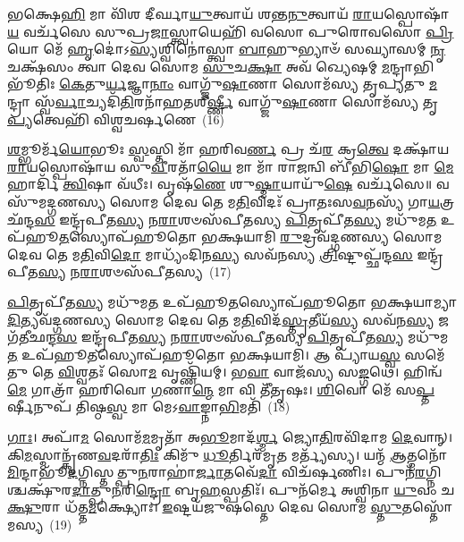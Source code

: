 {\anuvakamend[{\-\ul{𑌮}\-𑌖𑍋 𑌵𑌾 \ul{𑌅}\-𑌨𑍍𑌤𑌰𑌿᳴𑌕𑍍𑌷𑌾\-\ul{𑌤𑍍𑌪𑍍𑌰}\-𑌸𑌰𑍍𑌪᳴\-\ul{𑌨𑍍𑌤}\-𑌨𑍍𑌤𑍍𑌰𑌯᳴𑌸𑍍𑌤𑍍𑌰𑌿𑍞𑌶𑌚𑍍𑌚}]}%

𑌭𑌕𑍍𑌷𑍇\-\ul{𑌹𑌿} 𑌮𑌾 𑌵𑌿᳴𑌶 𑌦𑍀𑌰𑍍𑌘𑌾\-\ul{𑌯𑍁}\-𑌤𑍍𑌵𑌾𑌯᳴ 𑌶𑌨𑍍𑌤\-\ul{𑌨𑍁}\-𑌤𑍍𑌵𑌾𑌯᳴ \ul{𑌰𑌾}\-𑌯𑌸𑍍𑌪𑍋𑌷𑌾᳴\-\ul{𑌯} 𑌵𑌰𑍍𑌚᳴𑌸𑍇 𑌸𑍁𑌪𑍍𑌰\-\ul{𑌜𑌾}\-𑌸𑍍𑌤𑍍𑌵𑌾𑌯𑍇𑌹𑌿᳴ 𑌵𑌸𑍋 𑌪𑍁𑌰𑍋𑌵𑌸𑍋 \ul{𑌪𑍍𑌰𑌿}\-𑌯𑍋 𑌮𑍇᳴ \ul{𑌹𑍃}\-𑌦𑍋॑\-𑌽\-\ul{𑌸𑍍𑌯}\-𑌶𑍍𑌵𑌿𑌨𑍋॑𑌸𑍍𑌤𑍍𑌵𑌾 \ul{𑌬𑌾}\-𑌹𑍁𑌭𑍍𑌯𑌾𑍞᳴ 𑌸𑌘𑍍𑌯𑌾𑌸𑌮𑍍 \ul{𑌨𑍃}\-𑌚𑌕𑍍𑌷᳴𑌸𑌂 𑌤𑍍𑌵𑌾 𑌦𑍇𑌵 𑌸𑍋𑌮 \ul{𑌸𑍁}\-𑌚\-\ul{𑌕𑍍𑌷𑌾} 𑌅𑌵᳴ 𑌖𑍍𑌯𑍇𑌷𑌮𑍍 \ul{𑌮}\-𑌨𑍍𑌦𑍍𑌰𑌾𑌭𑌿𑌭𑍂᳴𑌤𑌿𑌃 \ul{𑌕𑍇}\-𑌤𑍁\-\ul{𑌰𑍍𑌯}\-𑌜𑍍𑌞𑌾\-\ul{𑌨𑌾𑌂} 𑌵𑌾𑌗𑍍𑌜𑍁᳴\-\ul{𑌷𑌾}\-𑌣𑌾 𑌸𑍋𑌮᳴𑌸𑍍𑌯 𑌤𑍃𑌪𑍍𑌯𑌤𑍁 \ul{𑌮}\-𑌨𑍍𑌦𑍍𑌰𑌾 𑌸𑍍𑌵᳴\-\ul{𑌰𑍍𑌵𑌾}\-𑌚𑍍𑌯𑌦𑌿᳴\-\ul{𑌤𑌿}\-𑌰𑌨𑌾᳴𑌹𑌤𑌶𑍀\-\ul{𑌰𑍍𑌷𑍍𑌣𑍀} 𑌵𑌾𑌗𑍍𑌜𑍁᳴\-\ul{𑌷𑌾}\-𑌣𑌾 𑌸𑍋𑌮᳴𑌸𑍍𑌯 𑌤𑍃\-\ul{𑌪𑍍𑌯}\-𑌤𑍍𑌵𑍇𑌹𑌿᳴ 𑌵𑌿𑌶𑍍𑌵𑌚𑌰𑍍\mbox{}𑌷𑌣𑍇~(16)

\-\ul{𑌶}\-𑌮𑍍𑌭𑍂𑌰𑍍𑌮᳴\-\ul{𑌯𑍋}\-𑌭𑍂𑌃 \ul{𑌸𑍍𑌵}\-𑌸𑍍𑌤𑌿 𑌮𑌾᳴ 𑌹𑌰𑌿𑌵\-\ul{𑌰𑍍𑌣} 𑌪𑍍𑌰 𑌚᳴\-\ul{𑌰} 𑌕𑍍𑌰\-\ul{𑌤𑍍𑌵𑍇} 𑌦𑌕𑍍𑌷𑌾᳴𑌯 \ul{𑌰𑌾}\-𑌯𑌸𑍍𑌪𑍋𑌷𑌾᳴𑌯 𑌸𑍁\-\ul{𑌵𑍀}\-𑌰𑌤𑌾᳴\-\ul{𑌯𑍈} 𑌮𑌾 𑌮𑌾᳴ 𑌰𑌾\-\ul{𑌜}\-𑌨𑍍𑌵𑌿 𑌬𑍀᳴𑌭𑌿\-\ul{𑌷𑍋} 𑌮𑌾 \ul{𑌮𑍇} 𑌹𑌾𑌰𑍍𑌦𑌿᳴ \ul{𑌤𑍍𑌵𑌿}\-𑌷𑌾 𑌵᳴𑌧𑍀𑌃। 𑌵𑍃𑌷᳴\-\ul{𑌣𑍇} 𑌶𑍁\-\ul{𑌷𑍍𑌮𑌾}\-𑌯𑌾𑌯𑍁᳴\-\ul{𑌷𑍇} 𑌵𑌰𑍍𑌚᳴𑌸𑍇॥ 𑌵𑌸𑍁᳴𑌮𑌦𑍍𑌗𑌣𑌸𑍍𑌯 𑌸𑍋𑌮 𑌦𑍇𑌵 𑌤𑍇 𑌮\-\ul{𑌤𑌿}\-𑌵𑌿𑌦𑌃᳴ 𑌪𑍍𑌰𑌾𑌤𑌃𑌸\-\ul{𑌵}\-𑌨𑌸𑍍𑌯᳴ 𑌗𑌾\-\ul{𑌯}\-𑌤𑍍𑌰𑌛᳴𑌨𑍍𑌦\-\ul{𑌸} 𑌇𑌨𑍍𑌦𑍍𑌰᳴𑌪𑍀𑌤\-\ul{𑌸𑍍𑌯} 𑌨\-\ul{𑌰𑌾}\-𑌶𑍞𑌸᳴𑌪𑍀𑌤𑌸𑍍𑌯 \ul{𑌪𑌿}\-𑌤𑍃𑌪𑍀᳴𑌤\-\ul{𑌸𑍍𑌯} 𑌮𑌧𑍁᳴𑌮\-\ul{𑌤} 𑌉𑌪᳴𑌹𑍂\-\ul{𑌤}\-𑌸𑍍𑌯𑍋𑌪᳴𑌹𑍂𑌤𑍋 𑌭𑌕𑍍𑌷𑌯𑌾𑌮𑌿 \ul{𑌰𑍁}\-𑌦𑍍𑌰𑌵᳴𑌦𑍍𑌗𑌣𑌸𑍍𑌯 𑌸𑍋𑌮 𑌦𑍇𑌵 𑌤𑍇 𑌮\-\ul{𑌤𑌿}\-𑌵𑌿\-\ul{𑌦𑍋} 𑌮𑌾𑌧𑍍𑌯𑌂᳴𑌦𑌿𑌨\-\ul{𑌸𑍍𑌯} 𑌸𑌵᳴𑌨𑌸𑍍𑌯 \ul{𑌤𑍍𑌰𑌿}\-𑌷𑍍𑌟𑍁𑌪𑍍𑌛᳴𑌨𑍍𑌦\-\ul{𑌸} 𑌇𑌨𑍍𑌦𑍍𑌰᳴𑌪𑍀𑌤\-\ul{𑌸𑍍𑌯} 𑌨\-\ul{𑌰𑌾}\-𑌶𑍞𑌸᳴𑌪𑍀𑌤𑌸𑍍𑌯~(17)

\-\ul{𑌪𑌿}\-𑌤𑍃𑌪𑍀᳴𑌤\-\ul{𑌸𑍍𑌯} 𑌮𑌧𑍁᳴𑌮\-\ul{𑌤} 𑌉𑌪᳴𑌹𑍂\-\ul{𑌤}\-𑌸𑍍𑌯𑍋𑌪᳴𑌹𑍂𑌤𑍋 𑌭𑌕𑍍𑌷𑌯𑌾𑌮𑍍𑌯𑌾\-\ul{𑌦𑌿}\-𑌤𑍍𑌯𑌵᳴𑌦𑍍𑌗𑌣𑌸𑍍𑌯 𑌸𑍋𑌮 𑌦𑍇𑌵 𑌤𑍇 𑌮\-\ul{𑌤𑌿}\-𑌵𑌿𑌦᳴\-\ul{𑌸𑍍𑌤𑍃}\-𑌤𑍀𑌯᳴\-\ul{𑌸𑍍𑌯} 𑌸𑌵᳴𑌨\-\ul{𑌸𑍍𑌯} 𑌜𑌗᳴𑌤𑍀𑌛𑌨𑍍𑌦\-\ul{𑌸} 𑌇𑌨𑍍𑌦𑍍𑌰᳴𑌪𑍀𑌤\-\ul{𑌸𑍍𑌯} 𑌨\-\ul{𑌰𑌾}\-𑌶𑍞𑌸᳴𑌪𑍀𑌤𑌸𑍍𑌯 \ul{𑌪𑌿}\-𑌤𑍃𑌪𑍀᳴𑌤\-\ul{𑌸𑍍𑌯} 𑌮𑌧𑍁᳴𑌮\-\ul{𑌤} 𑌉𑌪᳴𑌹𑍂\-\ul{𑌤}\-𑌸𑍍𑌯𑍋𑌪᳴𑌹𑍂𑌤𑍋 𑌭𑌕𑍍𑌷𑌯𑌾𑌮𑌿। 𑌆 𑌪𑍍𑌯𑌾᳴𑌯\-\ul{𑌸𑍍𑌵} 𑌸𑌮𑍇᳴𑌤𑍁 𑌤𑍇 \ul{𑌵𑌿}\-𑌶𑍍𑌵𑌤𑌃᳴ 𑌸𑍋\-\ul{𑌮} 𑌵𑍃𑌷𑍍𑌣𑌿᳴𑌯𑌮𑍍। 𑌭\-\ul{𑌵𑌾} 𑌵𑌾𑌜᳴𑌸𑍍𑌯 𑌸\-\ul{𑌙𑍍𑌗}\-𑌥𑍇। 𑌹𑌿𑌨𑍍𑌵᳴ \ul{𑌮𑍇} 𑌗𑌾𑌤𑍍𑌰𑌾᳴ 𑌹𑌰𑌿𑌵𑍋 \ul{𑌗}\-𑌣𑌾\-\ul{𑌨𑍍𑌮𑍇} 𑌮𑌾 𑌵𑌿 𑌤𑍀᳴𑌤𑍃𑌷𑌃। \ul{𑌶𑌿}\-𑌵𑍋 𑌮𑍇᳴ 𑌸\-\ul{𑌪𑍍𑌤}\-𑌰𑍍\mbox{}𑌷𑍀𑌨𑍁𑌪᳴ 𑌤𑌿𑌷𑍍𑌠\-\ul{𑌸𑍍𑌵} 𑌮𑌾 𑌮𑍇\-𑌽\-\ul{𑌵𑌾}\-𑌙𑍍𑌨𑌾\-\ul{𑌭𑌿}\-𑌮𑌤𑌿᳴~(18)

\-\ul{𑌗𑌾𑌃}\-। 𑌅𑌪𑌾᳴\-\ul{𑌮} 𑌸𑍋𑌮᳴\-\ul{𑌮}\-𑌮𑍃𑌤𑌾᳴ 𑌅\-\ul{𑌭𑍂}\-𑌮𑌾𑌦᳴\-\ul{𑌰𑍍𑌶𑍍𑌮} 𑌜𑍍𑌯𑍋\-\ul{𑌤𑌿}\-𑌰𑌵𑌿᳴𑌦𑌾𑌮 \ul{𑌦𑍇}\-𑌵𑌾𑌨𑍍। 𑌕𑌿\-\ul{𑌮}\-𑌸𑍍𑌮𑌾𑌨𑍍𑌕𑍃᳴𑌣\-\ul{𑌵}\-𑌦𑌰𑌾᳴\-\ul{𑌤𑌿𑌃} 𑌕𑌿𑌮𑍁᳴ \ul{𑌧𑍂}\-𑌰𑍍𑌤𑌿𑌰᳴𑌮𑍃\-\ul{𑌤} 𑌮𑌰𑍍𑌤𑍍𑌯᳴𑌸𑍍𑌯। 𑌯𑌨𑍍𑌮᳴ \ul{𑌆}\-𑌤𑍍𑌮𑌨𑍋᳴ \ul{𑌮𑌿}\-𑌨𑍍𑌦𑌾𑌭𑍂᳴\-\ul{𑌦}\-𑌗𑍍𑌨𑌿𑌸𑍍𑌤𑌤𑍍𑌪𑍁\-\ul{𑌨}\-𑌰𑌾𑌹𑌾॑\-\ul{𑌰𑍍𑌜𑌾}\-𑌤𑌵𑍇᳴\-\ul{𑌦𑌾} 𑌵𑌿𑌚᳴𑌰𑍍\mbox{}𑌷𑌣𑌿𑌃। 𑌪𑍁𑌨᳴\-\ul{𑌰}\-𑌗𑍍𑌨𑌿𑌶𑍍𑌚𑌕𑍍𑌷𑍁᳴𑌰\-\ul{𑌦𑌾}\-𑌤𑍍𑌪𑍁\-\ul{𑌨}\-𑌰𑌿\-\ul{𑌨𑍍𑌦𑍍𑌰𑍋} 𑌬𑍃\-\ul{𑌹}\-𑌸𑍍𑌪𑌤𑌿𑌃᳴। 𑌪𑍁𑌨᳴𑌰𑍍𑌮𑍇 𑌅𑌶𑍍𑌵𑌿𑌨𑌾 \ul{𑌯𑍁}\-𑌵𑌂 𑌚\-\ul{𑌕𑍍𑌷𑍁}\-𑌰𑌾 𑌧᳴𑌤𑍍𑌤\-\ul{𑌮}\-𑌕𑍍𑌷𑍍𑌯𑍋𑌃। \ul{𑌇}\-𑌷𑍍𑌟𑌯᳴𑌜𑍁𑌷𑌸𑍍𑌤𑍇 𑌦𑍇𑌵 𑌸𑍋𑌮 \ul{𑌸𑍍𑌤𑍁}\-𑌤𑌸𑍍𑌤𑍋᳴𑌮𑌸𑍍𑌯~(19)


